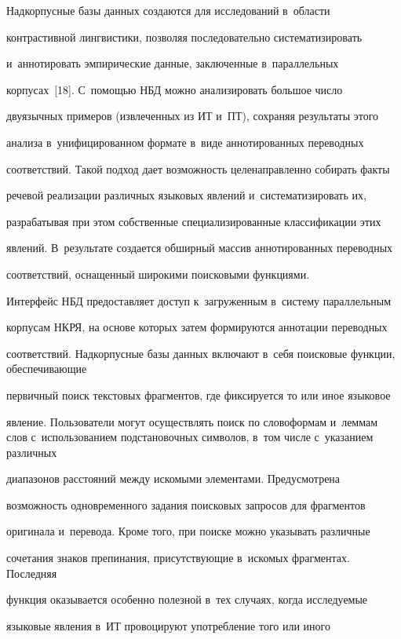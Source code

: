   Надкорпусные базы данных создаются для исследований в~области 


контрастивной лингвистики, позволяя последовательно систематизировать 


и~аннотировать эмпирические данные, заключенные в~параллельных 


корпусах~[18]. С~по\-мощью НБД можно анализировать большое число 


двуязычных примеров (извлеченных из ИТ и~ПТ), сохраняя результаты этого 


анализа в~унифицированном формате в~виде аннотированных переводных 


соответствий. Такой подход дает возможность целенаправленно собирать факты 


речевой реализации различных языковых явлений и~систематизировать их, 


разрабатывая при этом собственные специализированные классификации этих 


явлений. В~результате создается обширный массив аннотированных переводных 


соответствий, оснащенный широкими поисковыми функциями.


  


  Интерфейс НБД предоставляет доступ к~загруженным в~систему параллельным 


корпусам НКРЯ, на основе которых затем формируются аннотации переводных 


соответствий. Надкорпусные базы данных включают в~себя поисковые функции, обеспечивающие 


первичный поиск текстовых фрагментов, где фиксируется то или иное языковое 


явление. Пользователи могут осуществлять поиск по словоформам и~леммам слов с~использованием подстановочных символов, в~том числе с~указанием различных 


диапазонов расстояний между искомыми элементами. Предусмотрена 


возможность одновременного задания поисковых запросов для фрагментов 


оригинала и~перевода. Кроме того, при поиске можно указывать различные 


сочетания знаков препинания, присутствующие в~искомых фрагментах. Последняя 


функция оказывается особенно полезной в~тех случаях, когда исследуемые 


языковые явления в~ИТ провоцируют употребление того или иного 


